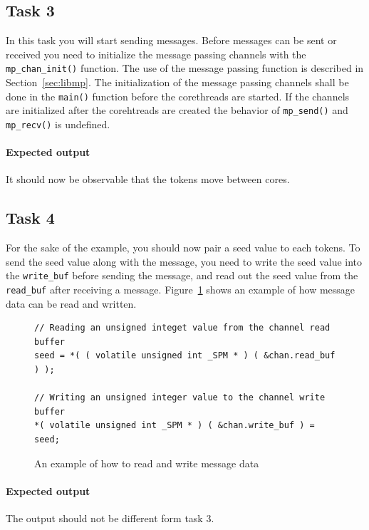 \documentclass[a4paper,fontsize=10pt,twoside,DIV15,BCOR12mm,headinclude=true,footinclude=false,pagesize,bibtotoc]{scrbook}
\newcommand{\code}[1]{{\texttt{#1}}}
\begin{document}
\subsection{Task 3}
In this task you will start sending messages.
Before messages can be sent or received you need to initialize the message passing channels with the \code{mp\_chan\_init()} function.
The use of the message passing function is described in Section~\ref{sec:libmp}.
The initialization of the message passing channels shall be done in the \code{main()} function before the corethreads are started.
If the channels are initialized after the corehtreads are created the behavior of
\code{mp\_send()} and \code{mp\_recv()} is undefined.


\paragraph*{Expected output}
It should now be observable that the tokens move between cores.

\subsection{Task 4}
For the sake of the example, you should now pair a seed value to each tokens.
To send the seed value along with the message, you need to write the seed value into
the \code{write\_buf} before sending the message, and read out the seed value from the \code{read\_buf}
after receiving a message.
Figure~\ref{fig:msg_data} shows an example of how message data can be read and written.

\begin{figure}
\begin{Verbatim}[xleftmargin=1cm,xrightmargin=1cm,frame=single,framesep=3mm]
// Reading an unsigned integet value from the channel read buffer
seed = *( ( volatile unsigned int _SPM * ) ( &chan.read_buf ) );

// Writing an unsigned integer value to the channel write buffer
*( volatile unsigned int _SPM * ) ( &chan.write_buf ) = seed; 
\end{Verbatim}
\caption{\label{fig:msg_data}An example of how to read and write message data}
\end{figure}

\paragraph*{Expected output}
The output should not be different form task 3.
\end{document}
